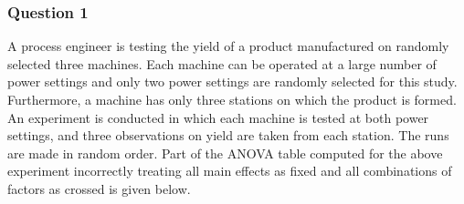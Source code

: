 \documentclass[12pt,]{article}
\title{}
\author{}
\date{}
\begin{document}
\hypertarget{question-1}{%
\subsubsection{Question 1}\label{question-1}}

\textcolor[rgb]{0.7,0.7,0.7}{A process engineer is testing the yield of a product manufactured on randomly selected three machines. Each machine can be operated at a large number of power settings and only two power settings are randomly selected for this study. Furthermore, a machine has only three stations on which the product is formed. An experiment is conducted in which each machine is tested at both power settings, and three observations on yield are taken from each station. The runs are made in random order.
Part of the ANOVA table computed for the above experiment incorrectly treating all main effects as fixed and all combinations of factors as crossed is given below.}
\end{document}
